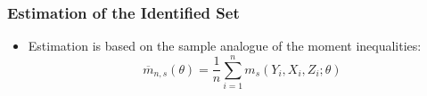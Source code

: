 \documentclass[10pt,letterpaper]{beamer}
\begin{document}
\begin{frame}[label=estset] 
\frametitle{Estimation of the Identified Set}

\begin{itemize}
\item Estimation is based on the sample analogue of the moment inequalities:
\begin{equation*}
\overline{m}_{n,s}(\theta)=\frac{1}{n}\sum_{i=1}^{n}m_{s}(Y_{i},X_{i},Z_{i};%
\theta)
\end{equation*}
\begin{figure}[h!]
\begin{center}
\end{center}
\end{figure}
\end{itemize}

\end{frame}

\end{document}
